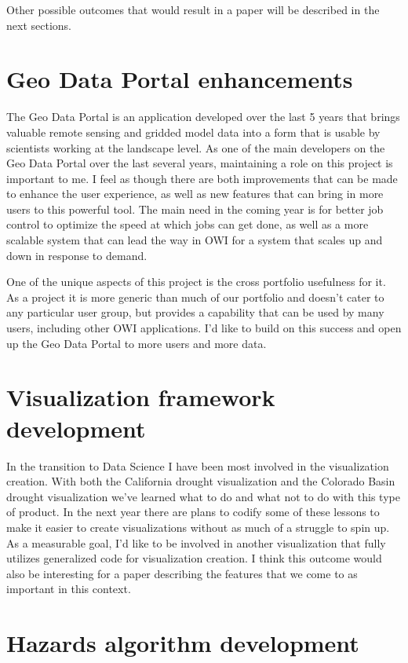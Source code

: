 \documentclass{article}
\begin{document}
Other possible outcomes that would result in a paper will be described in the next sections.

\section{Geo Data Portal enhancements}

The Geo Data Portal is an application developed over the last 5 years that brings valuable remote sensing and gridded model data into a form that is usable by scientists working at the landscape level.
As one of the main developers on the Geo Data Portal over the last several years, maintaining a role on this project is important to me.
I feel as though there are both improvements that can be made to enhance the user experience, as well as new features that can bring in more users to this powerful tool.
The main need in the coming year is for better job control to optimize the speed at which jobs can get done, as well as a more scalable system that can lead the way in OWI for a system that scales up and down in response to demand.

One of the unique aspects of this project is the cross portfolio usefulness for it.
As a project it is more generic than much of our portfolio and doesn't cater to any particular user group, but provides a capability that can be used by many users, including other OWI applications.
I'd like to build on this success and open up the Geo Data Portal to more users and more data.

\section{Visualization framework development}

In the transition to Data Science I have been most involved in the visualization creation.
With both the California drought visualization and the Colorado Basin drought visualization we've learned what to do and what not to do with this type of product.
In the next year there are plans to codify some of these lessons to make it easier to create visualizations without as much of a struggle to spin up.
As a measurable goal, I'd like to be involved in another visualization that fully utilizes generalized code for visualization creation.
I think this outcome would also be interesting for a paper describing the features that we come to as important in this context.

\section{Hazards algorithm development}
\end{document}
